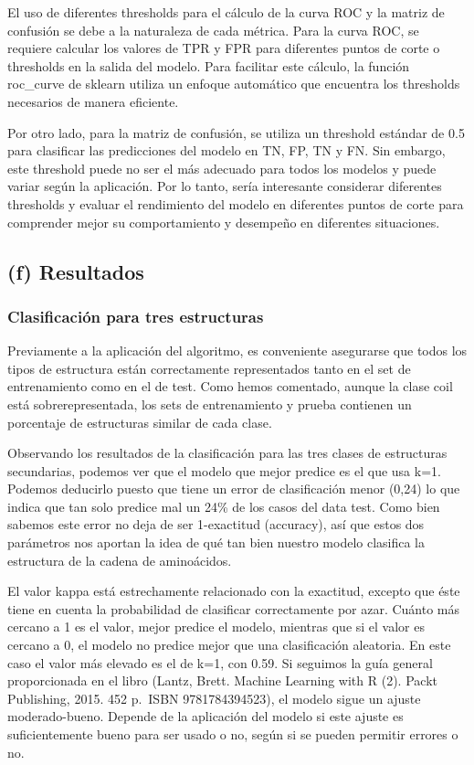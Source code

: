 \documentclass[
]{article}
\begin{document}
El uso de diferentes thresholds para el cálculo de la curva ROC y la
matriz de confusión se debe a la naturaleza de cada métrica. Para la
curva ROC, se requiere calcular los valores de TPR y FPR para diferentes
puntos de corte o thresholds en la salida del modelo. Para facilitar
este cálculo, la función roc\_curve de sklearn utiliza un enfoque
automático que encuentra los thresholds necesarios de manera eficiente.

Por otro lado, para la matriz de confusión, se utiliza un threshold
estándar de 0.5 para clasificar las predicciones del modelo en TN, FP,
TN y FN. Sin embargo, este threshold puede no ser el más adecuado para
todos los modelos y puede variar según la aplicación. Por lo tanto,
sería interesante considerar diferentes thresholds y evaluar el
rendimiento del modelo en diferentes puntos de corte para comprender
mejor su comportamiento y desempeño en diferentes situaciones.

\hypertarget{f-resultados}{%
\subsection{(f) Resultados}\label{f-resultados}}

\hypertarget{clasificaciuxf3n-para-tres-estructuras}{%
\subsubsection{Clasificación para tres
estructuras}\label{clasificaciuxf3n-para-tres-estructuras}}

Previamente a la aplicación del algoritmo, es conveniente asegurarse que
todos los tipos de estructura están correctamente representados tanto en
el set de entrenamiento como en el de test. Como hemos comentado, aunque
la clase coil está sobrerepresentada, los sets de entrenamiento y prueba
contienen un porcentaje de estructuras similar de cada clase.

Observando los resultados de la clasificación para las tres clases de
estructuras secundarias, podemos ver que el modelo que mejor predice es
el que usa k=1. Podemos deducirlo puesto que tiene un error de
clasificación menor (0,24) lo que indica que tan solo predice mal un
24\% de los casos del data test. Como bien sabemos este error no deja de
ser 1-exactitud (accuracy), así que estos dos parámetros nos aportan la
idea de qué tan bien nuestro modelo clasifica la estructura de la cadena
de aminoácidos.

El valor kappa está estrechamente relacionado con la exactitud, excepto
que éste tiene en cuenta la probabilidad de clasificar correctamente por
azar. Cuánto más cercano a 1 es el valor, mejor predice el modelo,
mientras que si el valor es cercano a 0, el modelo no predice mejor que
una clasificación aleatoria. En este caso el valor más elevado es el de
k=1, con 0.59. Si seguimos la guía general proporcionada en el libro
(Lantz, Brett. Machine Learning with R (2). Packt Publishing, 2015. 452
p.~ISBN 9781784394523), el modelo sigue un ajuste moderado-bueno.
Depende de la aplicación del modelo si este ajuste es suficientemente
bueno para ser usado o no, según si se pueden permitir errores o no.
\end{document}
